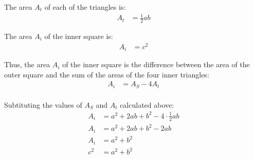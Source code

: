 \documentclass{article}
\begin{document}
The area \(A_t\) of each of the triangles is:
\begin{align}
A_t &= \frac{1}{2}ab 
\end{align}

The area \(A_i\) of the inner square is:
\begin{align}
A_i &= c^2
\end{align}

\begin{center}
\end{center}

Thus, the area \(A_i\) of the inner square is the difference between the area of the outer square and the sum of the areas of the four inner triangles:
\begin{align}
A_i &= A_S - 4A_t \\
\end{align}

Subtituting the values of \(A_S\) and \(A_t\) calculated above:
\begin{align}
A_i &= a^2 + 2ab + b^2 - 4\cdot\frac{1}{2}ab \\
A_i &= a^2 + 2ab + b^2 - 2ab \\
A_i &= a^2 + b^2 \\
c^2 &= a^2 + b^2 
\end{align}
\end{document}

